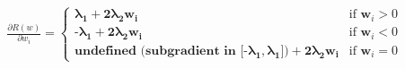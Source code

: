 \documentclass[preview]{standalone}
\begin{document}
\begin{align*}
\frac{\partial R(w)}{\partial w_i} =\begin{cases}\boldsymbol{\lambda}_\textbf{1} + \textbf{2}\boldsymbol{\lambda}_\textbf{2} \mathbf{w_i} & \text{if } \mathbf{w}_i > 0 \\\textbf{-}\boldsymbol{\lambda}_\textbf{1} + \textbf{2}\boldsymbol{\lambda}_\textbf{2} \mathbf{w_i} & \text{if } \mathbf{w}_i < 0 \\\textbf{undefined (subgradient in } \textbf{[}\textbf{-}\boldsymbol{\lambda}_\textbf{1}, \boldsymbol{\lambda}_\textbf{1}\textbf{]}\textbf{)} + \textbf{2}\boldsymbol{\lambda}_\textbf{2}\mathbf{w}_\textbf{i} & \text{if } \mathbf{w}_i = 0\end{cases}
\end{align*}
\end{document}
